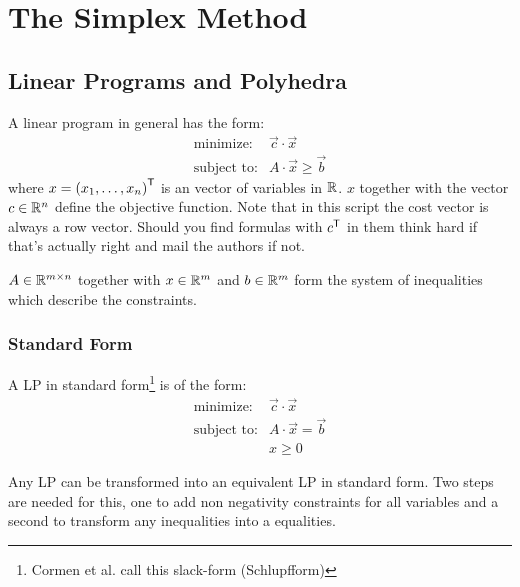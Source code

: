 \chapter{The Simplex Method}
\section{Linear Programs and Polyhedra}
A linear program in general has the form:
\begin{eqnarray*}
\text{minimize:}& \vec c \cdot \vec x \\
\text{subject to:} & A \cdot \vec x \geq \vec b
\end{eqnarray*}
where $x={({x}_1,\ldots,{x}_{n})}^\text{\upshape \sffamily T}$ is an vector of variables in $\mathbb{R}$. $x$ together with the vector $c \in \mathbb{R}^n$ define the objective function. Note that in this script the cost vector is always a row vector. Should you find formulas with ${c}^\text{\upshape \sffamily T}$ in them think hard if that's actually right and mail the authors if not.

$A \in \mathbb{R}^{m \times n}$ together with $x\in \mathbb{R}^m$ and $b \in \mathbb{R}^m$ form the system of inequalities which describe the constraints.

\subsection*{Standard Form}\label{Sec:standardForm}
A LP in standard form\footnote{Cormen et al. call this slack-form (Schlupfform)} is of the form:
\begin{eqnarray*}
\text{minimize:}& \vec c \cdot \vec x \\
\text{subject to:} & A \cdot \vec x = \vec b \\
& x\geq0
\end{eqnarray*}

Any LP can be transformed into an equivalent LP in standard form. Two steps are needed for this, one to add non negativity constraints for all variables and a second to transform any inequalities into a equalities.

